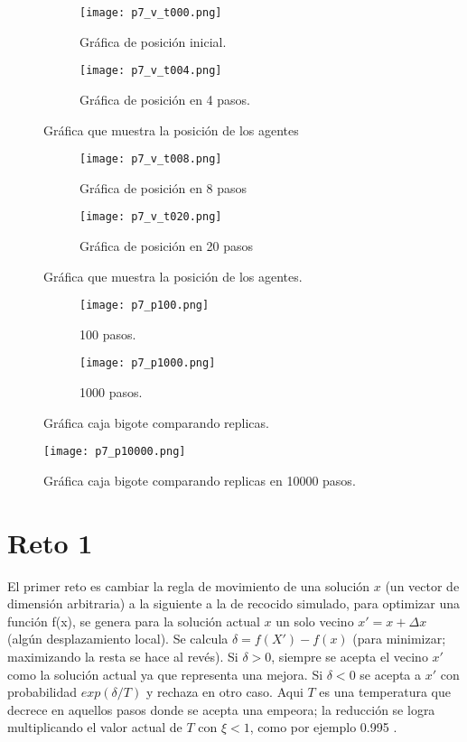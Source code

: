 \documentclass{article}
\begin{document}
\begin{figure}[H]
\centering
\begin{subfigure}[b]{0.40\linewidth}
\texttt{[image: p7\_v\_t000.png]}
\caption{Gráfica de posición inicial.}
\end{subfigure}
\begin{subfigure}[b]{0.40\linewidth}
\texttt{[image: p7\_v\_t004.png]}
\caption{Gráfica de posición en 4 pasos.}
\end{subfigure}
\caption{Gráfica que muestra la posición de los agentes}
\label{fig:westminster}
\end{figure}

\begin{figure}[H]
\centering
\begin{subfigure}[b]{0.40\linewidth}
\texttt{[image: p7\_v\_t008.png]}
\caption{Gráfica de posición en 8 pasos }
\end{subfigure}
\begin{subfigure}[b]{0.40\linewidth}
\texttt{[image: p7\_v\_t020.png]}
\caption{Gráfica de posición en 20 pasos}
\end{subfigure}
\caption{Gráfica que muestra la posición de los agentes.}
\label{fig:westminster}
\end{figure}

\begin{figure}[H]
\centering
\begin{subfigure}[b]{0.40\linewidth}
\texttt{[image: p7\_p100.png]}
\caption{100 pasos.}
\end{subfigure}
\begin{subfigure}[b]{0.40\linewidth}
\texttt{[image: p7\_p1000.png]}
\caption{1000 pasos.}
\end{subfigure}
\caption{Gráfica caja bigote comparando replicas.}
\label{fig:westminster}
\end{figure}

\begin{figure}[H]
\centering
\texttt{[image: p7\_p10000.png]}
\caption{\label{fig3} Gráfica caja bigote comparando replicas en 10000 pasos.}
\end{figure}



\section{Reto 1}
El primer reto es cambiar la regla de movimiento de una solución $x$ (un vector de dimensión arbitraria) a la siguiente a la de recocido simulado, para optimizar una función {f(x)}, se genera para la solución actual $x$ un solo vecino $x' = x + \Delta x$ (algún desplazamiento local). Se calcula $ \delta = f(X') - f(x)$ (para minimizar; maximizando la resta se hace al revés). Si $\delta > 0$, siempre se acepta el vecino $x'$ como la solución actual ya que representa una mejora. Si  $\delta < 0$ se acepta a $x'$ con probabilidad $exp(\delta / T )$ y rechaza en otro caso. Aqui $T$ es una temperatura que decrece en aquellos pasos donde se acepta una empeora; la reducción se logra multiplicando el valor actual de $T$ con $\xi < 1$, como por ejemplo 0.995 \cite{Satu_Elisa_Schaeffer}.
\end{document}
